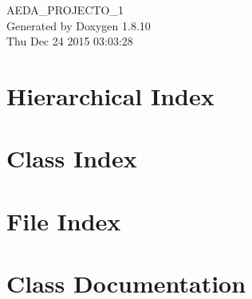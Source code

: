 \documentclass[twoside]{book}
\newcommand{\+}{\discretionary{\mbox{\scriptsize$\hookleftarrow$}}{}{}}
\newcommand{\clearemptydoublepage}{%
  \newpage{\pagestyle{empty}\cleardoublepage}%
}
\begin{document}
\hypersetup{pageanchor=false,
             bookmarks=true,
             bookmarksnumbered=true,
             pdfencoding=unicode
            }
\begin{titlepage}
\vspace*{7cm}
\begin{center}%
{\Large A\+E\+D\+A\+\_\+\+P\+R\+O\+J\+E\+C\+T\+O\+\_\+1 }\\
\vspace*{1cm}
{\large Generated by Doxygen 1.8.10}\\
\vspace*{0.5cm}
{\small Thu Dec 24 2015 03:03:28}\\
\end{center}
\end{titlepage}
\clearemptydoublepage
\tableofcontents
\clearemptydoublepage
{}
\hypersetup{pageanchor=true}

\chapter{Hierarchical Index}

\chapter{Class Index}

\chapter{File Index}

\chapter{Class Documentation}































\end{document}
